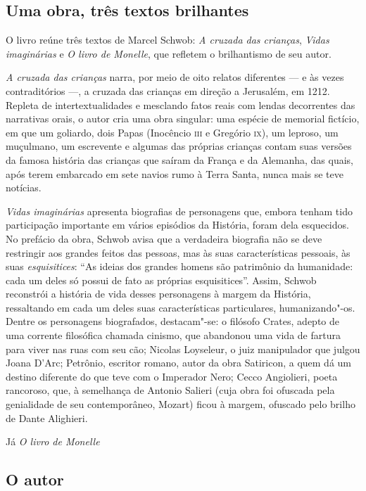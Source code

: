\documentclass[12pt]{extarticle}
\begin{document}
\subsection{Uma obra, três textos brilhantes}

O livro reúne três textos de Marcel Schwob: \emph{A cruzada das crianças}, \emph{Vidas imaginárias} e \emph{O livro de Monelle}, que refletem o brilhantismo de
seu autor.

\textit{A cruzada das crianças} narra, por meio de oito relatos diferentes --- e
às vezes contraditórios ---, a cruzada das crianças em direção a
Jerusalém, em 1212. Repleta de intertextualidades e mesclando fatos
reais com lendas decorrentes das narrativas orais, o autor cria uma obra
singular: uma espécie de memorial fictício, em que um goliardo, dois
Papas (Inocêncio \textsc{iii} e Gregório \textsc{ix}), um leproso, um muçulmano, um
escrevente e algumas das próprias crianças contam suas versões da famosa
história das crianças que saíram da França e da Alemanha, das quais,
após terem embarcado em sete navios rumo à Terra Santa, nunca mais se
teve notícias.

\emph{Vidas imaginárias} apresenta biografias de personagens que, embora tenham
tido participação importante em vários episódios da História, foram dela
esquecidos. No prefácio da obra, Schwob avisa que a verdadeira biografia
não se deve restringir aos grandes feitos das pessoas, mas às suas
características pessoais, às suas \emph{esquisitices}: ``As ideias dos grandes
homens são patrimônio da humanidade: cada um deles só possui de fato as
próprias esquisitices''. Assim, Schwob reconstrói a história de
vida desses personagens à margem da História, ressaltando em cada um
deles suas características particulares, humanizando"-os. Dentre os
personagens biografados, destacam"-se: o filósofo Crates, adepto de uma
corrente filosófica chamada cinismo, que abandonou uma vida de fartura
para viver nas ruas com seu cão; Nicolas Loyseleur, o juiz manipulador
que julgou Joana D'Arc; Petrônio, escritor romano, autor da obra
Satiricon, a quem dá um destino diferente do que teve com o Imperador
Nero; Cecco Angiolieri, poeta rancoroso, que, à semelhança de Antonio
Salieri (cuja obra foi ofuscada pela genialidade de seu contemporâneo,
Mozart) ficou à margem, ofuscado pelo brilho de Dante Alighieri.

Já \emph{O livro de Monelle}


\subsection{O autor}
\end{document}
